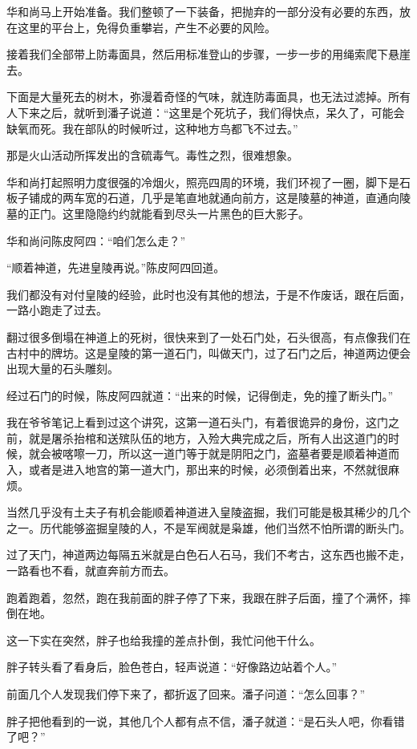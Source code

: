 华和尚马上开始准备。我们整顿了一下装备，把抛弃的一部分没有必要的东西，放在这里的平台上，免得负重攀岩，产生不必要的风险。

接着我们全部带上防毒面具，然后用标准登山的步骤，一步一步的用绳索爬下悬崖去。

下面是大量死去的树木，弥漫着奇怪的气味，就连防毒面具，也无法过滤掉。所有人下来之后，就听到潘子说道：“这里是个死坑子，我们得快点，呆久了，可能会缺氧而死。我在部队的时候听过，这种地方鸟都飞不过去。”

那是火山活动所挥发出的含硫毒气。毒性之烈，很难想象。

华和尚打起照明力度很强的冷烟火，照亮四周的环境，我们环视了一圈，脚下是石板子铺成的两车宽的石道，几乎是笔直地就通向前方，这是陵墓的神道，直通向陵墓的正门。这里隐隐约约就能看到尽头一片黑色的巨大影子。

华和尚问陈皮阿四：“咱们怎么走？”

“顺着神道，先进皇陵再说。”陈皮阿四回道。

我们都没有对付皇陵的经验，此时也没有其他的想法，于是不作废话，跟在后面，一路小跑走了过去。

翻过很多倒塌在神道上的死树，很快来到了一处石门处，石头很高，有点像我们在古村中的牌坊。这是皇陵的第一道石门，叫做天门，过了石门之后，神道两边便会出现大量的石头雕刻。

经过石门的时候，陈皮阿四就道：“出来的时候，记得倒走，免的撞了断头门。”

我在爷爷笔记上看到过这个讲究，这第一道石头门，有着很诡异的身份，这门之前，就是屠杀抬棺和送殡队伍的地方，入殓大典完成之后，所有人出这道门的时候，就会被喀嚓一刀，所以这一道门等于就是阴阳之门，盗墓者要是顺着神道而入，或者是进入地宫的第一道大门，那出来的时候，必须倒着出来，不然就很麻烦。

当然几乎没有土夫子有机会能顺着神道进入皇陵盗掘，我们可能是极其稀少的几个之一。历代能够盗掘皇陵的人，不是军阀就是枭雄，他们当然不怕所谓的断头门。

过了天门，神道两边每隔五米就是白色石人石马，我们不考古，这东西也搬不走，一路看也不看，就直奔前方而去。

跑着跑着，忽然，跑在我前面的胖子停了下来，我跟在胖子后面，撞了个满怀，摔倒在地。

这一下实在突然，胖子也给我撞的差点扑倒，我忙问他干什么。

胖子转头看了看身后，脸色苍白，轻声说道：“好像路边站着个人。”

前面几个人发现我们停下来了，都折返了回来。潘子问道：“怎么回事？”

胖子把他看到的一说，其他几个人都有点不信，潘子就道：“是石头人吧，你看错了吧？”

